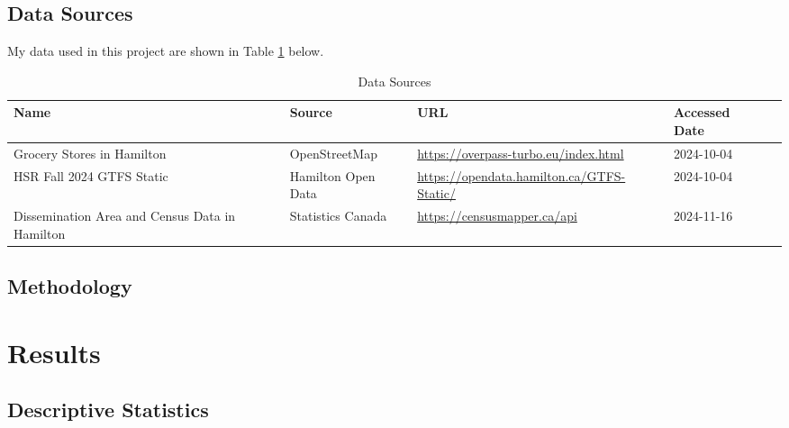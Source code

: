 \documentclass[preprint, 3p,
authoryear]{elsarticle} %
\begin{document}
\subsection{Data Sources}\label{data-sources}

My data used in this project are shown in Table \ref{tab:data_source}
below.

\begin{table}[h]
\centering
\begin{footnotesize}
\begin{tabularx}{\textwidth}{XllXl}
\hline
Name                                           & Source             & URL                                             & Accessed Date \\
\hline
Grocery Stores in Hamilton                     & OpenStreetMap      & \url{https://overpass-turbo.eu/index.html}      & 2024-10-04    \\
HSR Fall 2024 GTFS Static                      & Hamilton Open Data & \url{https://opendata.hamilton.ca/GTFS-Static/} & 2024-10-04    \\
Dissemination Area and Census Data in Hamilton & Statistics Canada  & \url{https://censusmapper.ca/api}               & 2024-11-16    \\
\hline
\end{tabularx}
\caption{\label{tab:data_source}Data Sources}
\end{footnotesize}
\end{table}

\subsection{Methodology}\label{methodology}

\section{Results}\label{results}

\subsection{Descriptive Statistics}\label{descriptive-statistics}
\end{document}
